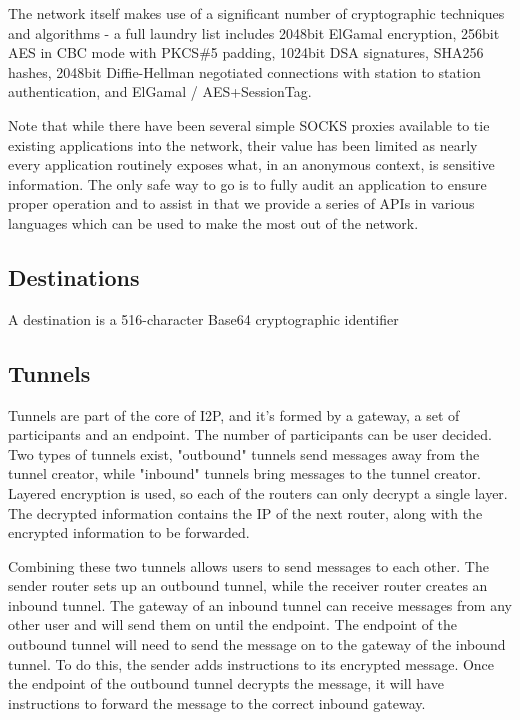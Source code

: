 \documentclass[a4paper,twocolumn,12pt]{article}
\begin{document}
The network itself makes use of a significant number of cryptographic techniques and algorithms - a full laundry list includes 2048bit ElGamal encryption, 256bit AES in CBC mode with PKCS\#5 padding, 1024bit DSA signatures, SHA256 hashes, 2048bit Diffie-Hellman negotiated connections with station to station authentication, and ElGamal / AES+SessionTag.

\vspace{2 em}

Note that while there have been several simple SOCKS proxies available to tie existing applications into the network, their value has been limited as nearly every application routinely exposes what, in an anonymous context, is sensitive information. The only safe way to go is to fully audit an application to ensure proper operation and to assist in that we provide a series of APIs in various languages which can be used to make the most out of the network.


\subsection{Destinations}

A destination is a 516-character Base64 cryptographic identifier

\subsection{Tunnels}

Tunnels are part of the core of I2P, and it's formed by a gateway, a set of participants and an endpoint. The number of participants can be user decided. Two types of tunnels exist, "outbound" tunnels send messages away from the tunnel creator, while "inbound" tunnels bring messages to the tunnel creator. Layered encryption is used, so each of the routers can only decrypt a single layer. The decrypted information contains the IP of the next router, along with the encrypted information to be forwarded.

Combining these two tunnels allows users to send messages to each other. The sender router sets up an outbound tunnel, while the receiver router creates an inbound tunnel. The gateway of an inbound tunnel can receive messages from any other user and will send them on until the endpoint. The endpoint of the outbound tunnel will need to send the message on to the gateway of the inbound tunnel. To do this, the sender adds instructions to its encrypted message. Once the endpoint of the outbound tunnel decrypts the message, it will have instructions to forward the message to the correct inbound gateway.
\end{document}

